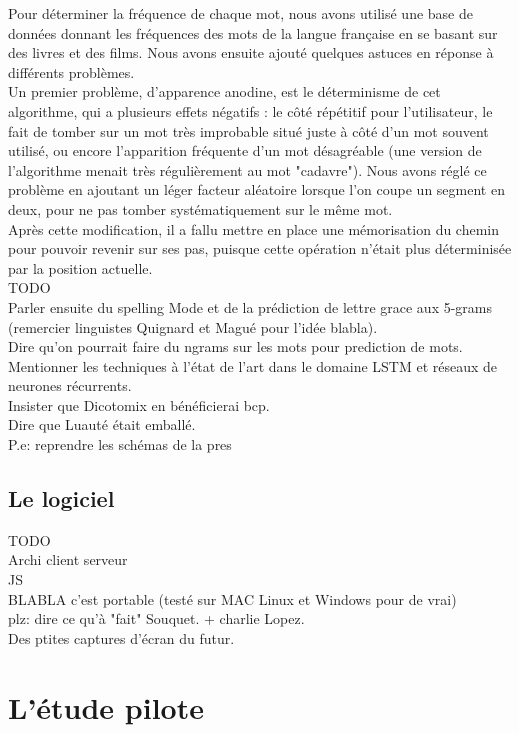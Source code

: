 \documentclass[11pt,a4paper]{article}
\theoremstyle{plain}
\theoremstyle{definition}
\begin{document}
Pour déterminer la fréquence de chaque mot, nous avons utilisé une base de données donnant les fréquences des mots de la langue française en se basant sur des livres et des films. Nous avons ensuite ajouté quelques astuces en réponse à différents problèmes.\\
Un premier problème, d'apparence anodine, est le déterminisme de cet algorithme, qui a plusieurs effets négatifs : le côté répétitif pour l'utilisateur, le fait de tomber sur un mot très improbable situé juste à côté d'un mot souvent utilisé, ou encore l'apparition fréquente d'un mot désagréable (une version de l'algorithme menait très régulièrement au mot "cadavre"). Nous avons réglé ce problème en ajoutant un léger facteur aléatoire lorsque l'on coupe un segment en deux, pour ne pas tomber systématiquement sur le même mot.\\
Après cette modification, il a fallu mettre en place une mémorisation du chemin pour pouvoir revenir sur ses pas, puisque cette opération n'était plus déterminisée par la position actuelle.\\
TODO \\
Parler ensuite du spelling Mode et de la prédiction de lettre grace aux 5-grams (remercier linguistes Quignard et Magué pour l'idée blabla).\\
Dire qu'on pourrait faire du ngrams sur les mots pour prediction de mots.\\
Mentionner les techniques à l'état de l'art dans le domaine LSTM et réseaux de neurones récurrents. \\
Insister que Dicotomix en bénéficierai bcp. \\
Dire que Luauté était emballé.  \\
P.e: reprendre les schémas de la pres

\subsection{Le logiciel}
TODO\\
Archi client serveur \\
JS \\
BLABLA c'est portable (testé sur MAC Linux et Windows pour de vrai) \\
plz: dire ce qu'à "fait" Souquet. + charlie Lopez. \\
Des ptites captures d'écran du futur. \\

\section{L'étude pilote}
\end{document}
